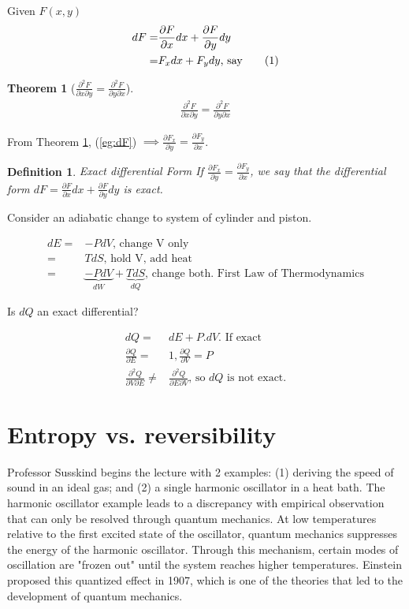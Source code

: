 \documentclass[]{article}
\newcommand\numberthis{\addtocounter{equation}{1}\tag{\theequation}}
\newtheorem{defn}{Definition}
\newtheorem{thm}{Theorem}
\begin{document}
Given $F(x,y)$
\begin{align*}
dF =& \frac{\partial F}{\partial x}dx + \frac{\partial F}{\partial y}dy\\
=& F_x dx + F_y dy\text{, say}\numberthis \label{eg:dF}
\end{align*}

\begin{thm}[$\frac{\partial^2 F}{\partial x \partial y} = \frac{\partial^2 F}{\partial y \partial x}$]\label{thm:2partial}
	\begin{align*}
	\frac{\partial^2 F}{\partial x \partial y} = \frac{\partial^2 F}{\partial y \partial x}
	\end{align*}
\end{thm}

From Theorem \ref{thm:2partial}, (\ref{eg:dF}) $\implies \frac{\partial F_x}{\partial y} = \frac{\partial F_y}{\partial x}$.

\begin{defn}{Exact differential Form}
	If $\frac{\partial F_x}{\partial y} = \frac{\partial F_y}{\partial x}$, we say that the differential form $dF = \frac{\partial F}{\partial x}dx + \frac{\partial F}{\partial y}dy$ is exact.
\end{defn}

Consider an adiabatic change to system of cylinder and piston.

\begin{align*}
dE =& -P dV \text{, change V only}\\
=& T dS \text{, hold V, add heat}\\
=& \underbrace{-P dV}_{dW} + \underbrace{T dS}_{dQ}\text {, change both. First Law of Thermodynamics}
\end{align*}

Is $dQ$ an exact differential?

\begin{align*}
dQ =& dE + P.dV\text{. If exact}\\
\frac{\partial Q}{\partial E}=&1, \frac{\partial Q}{\partial V} = P\\
\frac{\partial^2 Q}{\partial V \partial E} \ne& \frac{\partial^2 Q}{\partial E \partial V}\text{, so $dQ$ is not exact.}
\end{align*}

\section{Entropy vs. reversibility}

Professor Susskind begins the lecture with 2 examples: (1) deriving the speed of sound in an ideal  gas; and (2) a single harmonic oscillator in a heat bath.  The harmonic oscillator example leads to a discrepancy with empirical observation that can only be resolved through quantum mechanics.  At low temperatures relative to the first excited state of the oscillator, quantum mechanics suppresses the energy of the harmonic oscillator.  Through this mechanism, certain modes of oscillation are "frozen out" until the system reaches higher temperatures.  Einstein proposed this quantized effect in 1907, which is one of the theories that led to the development of quantum mechanics.
\end{document}

